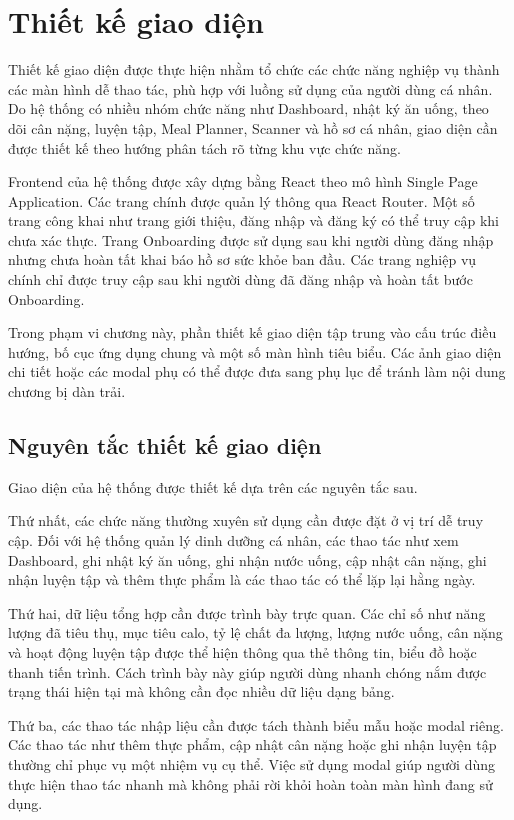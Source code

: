 \documentclass[12pt, a4paper]{report}
\begin{document}
\section{Thiết kế giao diện}Thiết kế giao diện được thực hiện nhằm tổ chức các chức năng nghiệp vụ thành các màn hình dễ thao tác, phù hợp với luồng sử dụng của người dùng cá nhân. Do hệ thống có nhiều nhóm chức năng như Dashboard, nhật ký ăn uống, theo dõi cân nặng, luyện tập, Meal Planner, Scanner và hồ sơ cá nhân, giao diện cần được thiết kế theo hướng phân tách rõ từng khu vực chức năng.

Frontend của hệ thống được xây dựng bằng React theo mô hình Single Page Application. Các trang chính được quản lý thông qua React Router. Một số trang công khai như trang giới thiệu, đăng nhập và đăng ký có thể truy cập khi chưa xác thực. Trang Onboarding được sử dụng sau khi người dùng đăng nhập nhưng chưa hoàn tất khai báo hồ sơ sức khỏe ban đầu. Các trang nghiệp vụ chính chỉ được truy cập sau khi người dùng đã đăng nhập và hoàn tất bước Onboarding.

Trong phạm vi chương này, phần thiết kế giao diện tập trung vào cấu trúc điều hướng, bố cục ứng dụng chung và một số màn hình tiêu biểu. Các ảnh giao diện chi tiết hoặc các modal phụ có thể được đưa sang phụ lục để tránh làm nội dung chương bị dàn trải.

\subsection{Nguyên tắc thiết kế giao diện}Giao diện của hệ thống được thiết kế dựa trên các nguyên tắc sau.

Thứ nhất, các chức năng thường xuyên sử dụng cần được đặt ở vị trí dễ truy cập. Đối với hệ thống quản lý dinh dưỡng cá nhân, các thao tác như xem Dashboard, ghi nhật ký ăn uống, ghi nhận nước uống, cập nhật cân nặng, ghi nhận luyện tập và thêm thực phẩm là các thao tác có thể lặp lại hằng ngày.

Thứ hai, dữ liệu tổng hợp cần được trình bày trực quan. Các chỉ số như năng lượng đã tiêu thụ, mục tiêu calo, tỷ lệ chất đa lượng, lượng nước uống, cân nặng và hoạt động luyện tập được thể hiện thông qua thẻ thông tin, biểu đồ hoặc thanh tiến trình. Cách trình bày này giúp người dùng nhanh chóng nắm được trạng thái hiện tại mà không cần đọc nhiều dữ liệu dạng bảng.

Thứ ba, các thao tác nhập liệu cần được tách thành biểu mẫu hoặc modal riêng. Các thao tác như thêm thực phẩm, cập nhật cân nặng hoặc ghi nhận luyện tập thường chỉ phục vụ một nhiệm vụ cụ thể. Việc sử dụng modal giúp người dùng thực hiện thao tác nhanh mà không phải rời khỏi hoàn toàn màn hình đang sử dụng.
\end{document}
